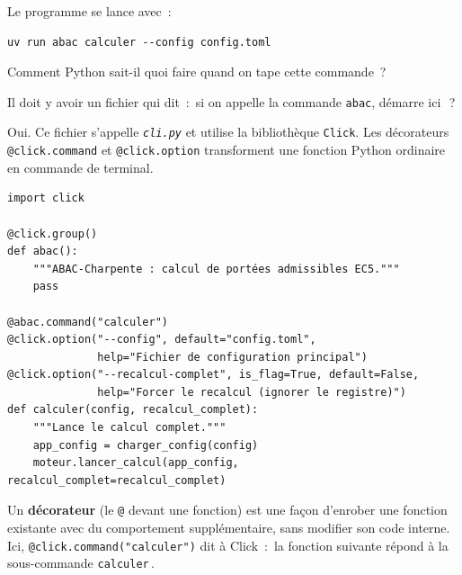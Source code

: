 \documentclass[12pt, a4paper, openany]{book}
\newcommand{\py}[1]{\texttt{#1}}
\newcommand{\fichier}[1]{\texttt{\textit{#1}}}
\begin{document}
Le programme se lance avec~:

\begin{lstlisting}[style=toml, language={}, caption={Lancement du logiciel}]
uv run abac calculer --config config.toml
\end{lstlisting}

\begin{maitre}
Comment Python sait-il quoi faire quand on tape cette commande~?
\end{maitre}

\begin{apprenti}
Il doit y avoir un fichier qui dit~:
\guillemotleft\,si on appelle la commande \py{abac}, d\'emarre ici\,\guillemotright~?
\end{apprenti}

\begin{maitre}
Oui. Ce fichier s'appelle \fichier{cli.py} et utilise la biblioth\`eque
\py{Click}. Les d\'ecorateurs \py{@click.command} et \py{@click.option}
transforment une fonction Python ordinaire en commande de terminal.
\end{maitre}

\begin{lstlisting}[style=python, caption={Extrait de \fichier{cli.py} --- point d'entrée simplifié}]
import click

@click.group()
def abac():
    """ABAC-Charpente : calcul de portées admissibles EC5."""
    pass

@abac.command("calculer")
@click.option("--config", default="config.toml",
              help="Fichier de configuration principal")
@click.option("--recalcul-complet", is_flag=True, default=False,
              help="Forcer le recalcul (ignorer le registre)")
def calculer(config, recalcul_complet):
    """Lance le calcul complet."""
    app_config = charger_config(config)
    moteur.lancer_calcul(app_config, recalcul_complet=recalcul_complet)
\end{lstlisting}

\begin{definition}
Un \textbf{d\'ecorateur} (le \py{@} devant une fonction) est une fa\c{c}on
d'enrober une fonction existante avec du comportement suppl\'ementaire,
sans modifier son code interne. Ici, \py{@click.command("calculer")} dit
\`a Click~: \guillemotleft\,la fonction suivante r\'epond \`a la
sous-commande \py{calculer}\,\guillemotright.
\end{definition}

\end{document}
